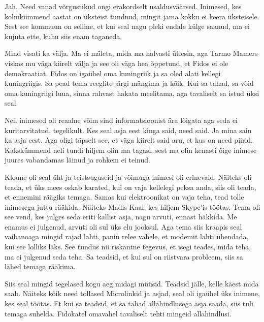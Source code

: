 
Jah. Need vanad võrgustikud ongi erakordselt usaldusväärsed. Inimesed, kes kolmkümmend aastat on üksteist tundnud, mingit jama kokku ei keera üksteisele. Sest see kommuun on selline, et kui seal nagu pleki endale külge saanud, ma ei kujuta ette, kuhu siis enam  taganeda. 


Mind  visati ka välja. Ma ei mäleta, mida ma halvasti ütlesin, aga Tarmo Mamers viskas mu väga kiirelt välja ja see oli väga hea õppetund, et Fidos ei ole demokraatiat. Fidos on igaühel oma kuningriik ja sa oled alati kellegi kuningriigis. Sa pead tema reeglite järgi mängima ja kõik. Kui sa tahad, sa võid oma kuningriigi luua, sinna rahvast hakata meelitama, aga tavaliselt sa istud üksi seal. 


Neil inimesed oli reaalne võim sind informatsioonist ära lõigata aga seda ei kuritarvitatud, tegelikult. Kes seal asja eest kinga said, need said. Ja mina sain ka asja eest. Aga oligi täpselt see, et väga kiirelt said aru, et kus on need piirid. Kakskümmend neli tundi hiljem olin ma  tagasi, sest ma olin kenasti õige inimese juures vabandamas läinud ja rohkem ei teinud. 

Kloune oli seal üht ja teistsuguseid ja võimuga inimesi oli erinevaid. Näiteks  oli teada, et üks mees oskab karated, kui on vaja kellelegi peksa anda, siis oli teada, et ennemini räägiks temaga. Samas kui elektroonikat on vaja teha, tead tolle inimesega juttu rääkida. Näiteks Madis Kaal, kes hiljem Skype'is töötas. Tema oli see vend, kes julges seda eriti kallist asja, nagu arvuti, ennast häkkida. Me enamus ei julgenud, arvuti oli sul üks elu jooksul. Aga tema siis kraapis seal vaibanoaga mingid rajad lahti, panin relee vahele, et modemit lahti ühendada, kui see lolliks läks. See tundus nii riskantne tegevus, et isegi teades, mida teha, ma ei julgenud seda teha. Sa teadsid, et kui sul on riistvara probleem, siis sa lähed temaga rääkima. 

Siis seal mingid tegelased kogu aeg midagi müüsid. Teadsid jälle, kelle käest mida saab. Näiteks kõik need tollased Microlinkid ja asjad,  seal oli igaühel  üks inimene, kes seal töötas. Et kui sa teadsid, et sa tahad allahindlusega asja saada,  siis tuli temaga suhelda. Fidokatel omavahel tavaliselt tehti mingeid allahindlusi. 

